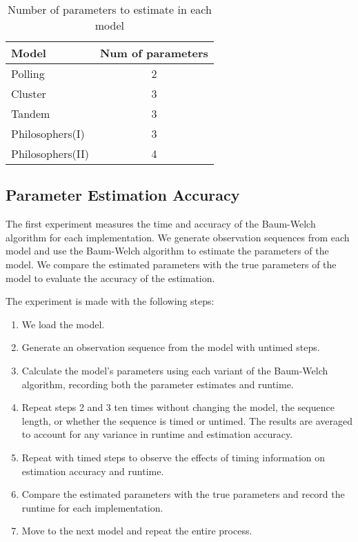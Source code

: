 \begin{table}[H]
    \centering
    \caption{Number of parameters to estimate in each model}
    \begin{tabular}{lc}
        \toprule
        Model & Num of parameters \\ 
        \midrule
        Polling & 2 \\ 
        Cluster & 3 \\ 
        Tandem & 3 \\ 
        Philosophers(I) & 3 \\ 
        Philosophers(II) & 4 \\
        \bottomrule
    \end{tabular}
    \label{tab:parameters}
\end{table}

\subsection{Parameter Estimation Accuracy}
The first experiment measures the time and accuracy of the Baum-Welch algorithm for each implementation. We generate observation sequences from each model and use the Baum-Welch algorithm to estimate the parameters of the model. We compare the estimated parameters with the true parameters of the model to evaluate the accuracy of the estimation.

The experiment is made with the following steps:
\begin{enumerate}
    \item We load the model.
    \item Generate an observation sequence from the model with untimed steps.
    \item Calculate the model’s parameters using each variant of the Baum-Welch algorithm, recording both the parameter estimates and runtime.
    \item Repeat steps 2 and 3 ten times without changing the model, the sequence length, or whether the sequence is timed or untimed. The results are averaged to account for any variance in runtime and estimation accuracy.
    \item Repeat with timed steps to observe the effects of timing information on estimation accuracy and runtime.
    \item Compare the estimated parameters with the true parameters and record the runtime for each implementation.
    \item Move to the next model and repeat the entire process.
\end{enumerate}

